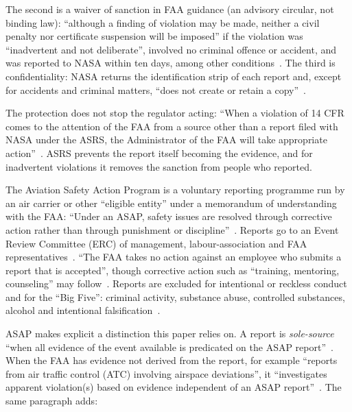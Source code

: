\documentclass[review,12pt]{elsarticle}
\makeatletter
\renewcommand\paragraph{\@startsection{paragraph}{4}{\z@}{1.5ex \@plus .5ex \@minus .2ex}{-1em}{\normalfont\normalsize\bfseries}}
\makeatother
\begin{document}
The second is a waiver of sanction in FAA guidance (an advisory circular, not binding law): ``although a finding of violation may be made, neither a civil penalty nor certificate suspension will be imposed'' if the violation was ``inadvertent and not deliberate'', involved no criminal offence or accident, and was reported to NASA within ten days, among other conditions~\cite[para.~12.3]{faa2021}. The third is confidentiality: NASA returns the identification strip of each report and, except for accidents and criminal matters, ``does not create or retain a copy''~\cite[para.~10.2]{faa2021}.

The protection does not stop the regulator acting: ``When a violation of 14 CFR comes to the attention of the FAA from a source other than a report filed with NASA under the ASRS, the Administrator of the FAA will take appropriate action''~\cite[para.~8.3]{faa2021}. ASRS prevents the report itself becoming the evidence, and for inadvertent violations it removes the sanction from people who reported.

\paragraph{ASAP.} The Aviation Safety Action Program is a voluntary reporting programme run by an air carrier or other ``eligible entity'' under a memorandum of understanding with the FAA: ``Under an ASAP, safety issues are resolved through corrective action rather than through punishment or discipline''~\cite[para.~1]{faa2020}. Reports go to an Event Review Committee (ERC) of management, labour-association and FAA representatives~\cite[para.~A.8]{faa2020}. ``The FAA takes no action against an employee who submits a report that is accepted'', though corrective action such as ``training, mentoring, counseling'' may follow~\cite[paras.~15, 16.1]{faa2020}. Reports are excluded for intentional or reckless conduct and for the ``Big Five'': criminal activity, substance abuse, controlled substances, alcohol and intentional falsification~\cite[paras.~18.2--18.4, A.4]{faa2020}.

ASAP makes explicit a distinction this paper relies on. A report is \emph{sole-source} ``when all evidence of the event available is predicated on the ASAP report''~\cite[para.~A.20]{faa2020}. When the FAA has evidence not derived from the report, for example ``reports from air traffic control (ATC) involving airspace deviations'', it ``investigates apparent violation(s) based on evidence independent of an ASAP report''~\cite[para.~16.4]{faa2020}. The same paragraph adds:
\end{document}
